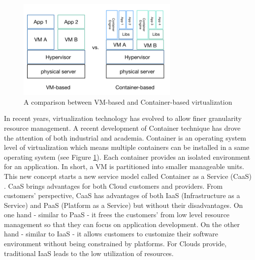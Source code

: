 \vspace{10mm}
\begin{figure}
	\centering
	\includegraphics[width=0.7\textwidth]{pics/comparison.png}
	\caption{A comparison between VM-based and Container-based virtualization}
	\label{fig:comparison}
\end{figure}

In recent years, virtualization technology has evolved to allow finer granularity resource management.
A recent development of Container technique \cite{Soltesz:2007cu} has drove the attention of both industrial and academia.
Container is an operating system level of virtualization which means multiple containers can be installed in a same operating system (see Figure \ref{fig:comparison}). Each container provides an isolated environment for an application. In short, a VM is partitioned into smaller manageable units.
This new concept starts a new service model called Container as a Service (CaaS) \cite{Piraghaj:2015uf}. CaaS brings advantages for both Cloud customers and providers.
From customers' perspective, CaaS has advantages of both IaaS (Infrastructure as a Service) and PaaS (Platform as a Service) but without their disadvantages. On one hand - similar to PaaS - it frees the customers' from low level resource management so that they can focus on application development. On the other hand - similar to IaaS - it allows customers to customize their software environment without being constrained by platforms. 
For Clouds provide, traditional IaaS leads to the low utilization of resources. 

